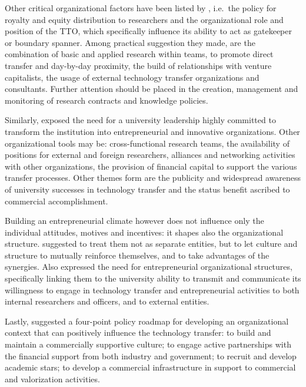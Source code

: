 Other critical organizational factors have been listed by \citet{Debackere2005}, i.e.\ the policy for royalty and equity distribution to researchers and the organizational role and position of the TTO, which specifically influence its ability to act as gatekeeper or boundary spanner. Among practical suggestion they made, are the combination of basic and applied research within teams, to promote direct transfer and day-by-day proximity, the build of relationships with venture capitalists, the usage of external technology transfer organizations and consultants. Further attention should be placed in the creation, management and monitoring of research contracts and knowledge policies.

Similarly, \citet{Guerrero2014} exposed the need for a university leadership highly committed to transform the institution into entrepreneurial and innovative organizations. Other organizational tools may be: cross-functional research teams, the availability of positions for external and foreign researchers, alliances and networking activities with other organizations, the provision of financial capital to support the various transfer processes. Other themes form \citet{OwenSmith2001} are the publicity and widespread awareness of university successes in technology transfer and the status benefit ascribed to commercial accomplishment.

Building an entrepreneurial climate however does not influence only the individual attitudes, motives and incentives: it shapes also the organizational structure. \citet{Rasmussen2006} suggested to treat them not as separate entities, but to let culture and structure to mutually reinforce themselves, and to take advantages of the synergies. Also \citet{Guerrero2014} expressed the need for entrepreneurial organizational structures, specifically linking them to the university ability to transmit and communicate its willingness to engage in technology transfer and entrepreneurial activities to both internal researchers and officers, and to external entities.  

Lastly, \citet{OShea2005} suggested a four-point policy roadmap for developing an organizational context that can positively influence the technology transfer: to build and maintain a commercially supportive culture; to engage active partnerships with the financial support from both industry and government; to recruit and develop academic stars; to develop a commercial infrastructure in support to commercial and valorization activities.

